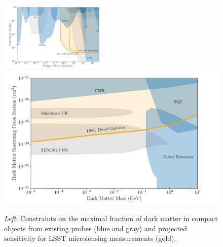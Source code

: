 \documentclass[12pt]{article}
\begin{document}
\begin{figure}[t]
\centering
\includegraphics[width=0.49\textwidth]{figures/macho_limits.pdf}
\includegraphics[width=0.49\columnwidth]{figures/bsdm_limits.pdf}
\caption{\label{fig:macho_constraints}
    \emph{Left}: Constraints on the maximal fraction of dark matter in compact objects from existing probes (blue and gray) and projected sensitivity for LSST microlensing measurements (gold).
}
\end{figure}
\end{document}
